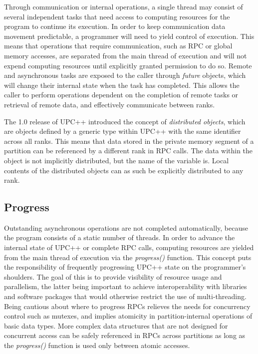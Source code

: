 \documentclass{uit-report}
\begin{document}
Through communication or internal operations, a single thread may consist of several independent tasks that need access to computing resources for the program to continue its execution. In order to keep communication data movement predictable, a programmer will need to yield control of execution. This means that operations that require communication, such as RPC or global memory accesses, are separated from the main thread of execution and will not expend computing resources until explicitly granted permission to do so. Remote and asynchronous tasks are exposed to the caller through \emph{future} objects, which will change their internal state when the task has completed. This allows the caller to perform operations dependent on the completion of remote tasks or retrieval of remote data, and effectively communicate between ranks.

The 1.0 release of UPC++ introduced the concept of \emph{distributed objects}, which are objects defined by a generic type within UPC++ with the same identifier across all ranks. This means that data stored in the private memory segment of a partition can be referenced by a different rank in RPC calls. The data within the object is not implicitly distributed, but the name of the variable is. Local contents of the distributed objects can as such be explicitly distributed to any rank.

\subsection{Progress}
Outstanding asynchronous operations are not completed automatically, because the program consists of a static number of threads. In order to advance the internal state of UPC++ or complete RPC calls, computing resources are yielded from the main thread of execution via the \emph{progress()} function. This concept puts the responsibility of frequently progressing UPC++ state on the programmer's shoulders. The goal of this is to provide visibility of resource usage and parallelism, the latter being important to achieve interoperability with libraries and software packages that would otherwise restrict the use of multi-threading. Being cautious about where to progress RPCs relieves the needs for concurrency control such as mutexes, and implies atomicity in partition-internal operations of basic data types. More complex data structures that are not designed for concurrent access can be safely referenced in RPCs across partitions as long as the \emph{progress()} function is used only between atomic accesses.
\end{document}
